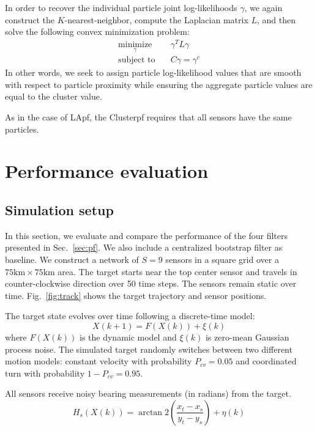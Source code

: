 \documentclass[10pt,letterpaper,final]{article}
\begin{document}
In order to recover the individual particle joint log-likelihoods $\gamma$, we again construct the $K$-nearest-neighbor, compute the Laplacian matrix $L$, and then solve the following convex minimization problem:
\begin{align*}
\underset{\gamma}{\text{minimize}}& \quad \gamma^TL\gamma  \\
\text{subject to}& \quad C\gamma = \gamma^c
\end{align*}
In other words, we seek to assign particle log-likelihood values that are smooth with respect to particle proximity while ensuring the aggregate particle values are equal to the cluster value. 

As in the case of LApf, the Clusterpf requires that all sensors have the same particles. 

\section{Performance evaluation}
\subsection{Simulation setup}
In this section, we evaluate and compare the performance of the four filters presented in Sec.~\ref{sec:pf}. We also include a centralized bootstrap filter as baseline. We construct a network of $S=9$ sensors in a square grid over a $75\text{km} \times 75\text{km}$ area. The target starts near the top center sensor and travels in counter-clockwise direction over 50 time steps. The sensors remain static over time. Fig.~\ref{fig:track} shows the target trajectory and sensor positions. 

The target state evolves over time following a discrete-time model:
\begin{equation}
X(k+1) = F(X(k))+\xi(k)
\end{equation}
where $F(X(k))$ is the dynamic model and $\xi(k)$ is zero-mean Gaussian process noise. The simulated target randomly switches between two different motion models: constant velocity with probability $P_{cv} = 0.05$ and coordinated turn with probability $1-P_{cv}=0.95$. 

All sensors receive noisy bearing measurements (in radians) from the target.
\begin{equation}
H_s(X(k))= \arctan2 \left( \frac{x_t-x_s}{y_t-y_s} \right) + \eta(k)
\end{equation}
\end{document}

